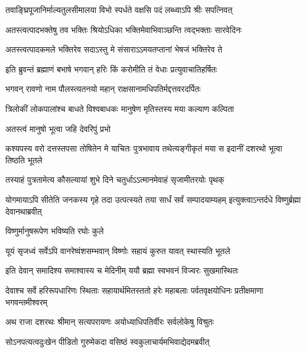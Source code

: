\twolineshloka
{तवाङ्घ्रिपूजानिर्माल्यतुलसीमालया विभो}
{स्पर्धते वक्षसि पदं लब्ध्वाऽपि श्रीः सपत्निवत्} %

\twolineshloka
{अतस्त्वत्पादभक्तेषु तव भक्तिः श्रियोऽधिका}
{भक्तिमेवाभिवाञ्छन्ति त्वद्भक्ताः सारवेदिनः} %

\twolineshloka
{अतस्त्वत्पादकमले भक्तिरेव सदाऽस्तु मे}
{संसाराऽऽमयतप्तानां भेषजं भक्तिरेव ते} %

\twolineshloka
{इति ब्रुवन्तं ब्रह्माणं बभाषे भगवान् हरिः}
{किं करोमीति तं वेधाः प्रत्युवाचातिहर्षितः} %

\twolineshloka
{भगवन् रावणो नाम पौलस्त्यतनयो महान्}
{राक्षसानामधिपतिर्मद्दत्तवरदर्पितः} %

\twolineshloka
{त्रिलोकीं लोकपालांश्च बाधते विश्वबाधकः}
{मानुषेण मृतिस्तस्य मया कल्याण कल्पिता} %

\onelineshloka
{अतस्त्वं मानुषो भूत्वा जहि देवरिपुं प्रभो} %



\threelineshloka
{कश्यपस्य वरो दत्तस्तपसा तोषितेन मे}
{याचितः पुत्रभावाय तथेत्यङ्गीकृतं मया}
{स इदानीं दशरथो भूत्वा तिष्ठति भूतले} %

\twolineshloka
{तस्याहं पुत्रतामेत्य कौसल्यायां शुभे दिने}
{चतुर्धाऽऽत्मानमेवाहं सृजामीतरयोः पृथक्} %

\threelineshloka
{योगमायाऽपि सीतेति जनकस्य गृहे तदा}
{उत्पत्स्यते तया सार्धं सर्वं सम्पादयाम्यहम्}
{इत्युक्त्वाऽन्तर्दधे विष्णुर्ब्रह्मा देवानथाब्रवीत्} %


\onelineshloka
{विष्णुर्मानुषरूपेण भविष्यति रघोः कुले} %

\twolineshloka
{यूयं सृजध्वं सर्वेऽपि वानरेष्वंशसम्भवान्}
{विष्णोः सहायं कुरुत यावत् स्थास्यति भूतले} %

\twolineshloka
{इति देवान् समादिश्य समाश्वास्य च मेदिनीम्}
{ययौ ब्रह्मा स्वभवनं विज्वरः सुखमास्थितः} %

\fourlineindentedshloka
{देवाश्च सर्वे हरिरूपधारिणः}
{स्थिताः सहायार्थमितस्ततो हरेः}
{महाबलाः पर्वतवृक्षयोधिनः}
{प्रतीक्षमाणा भगवन्तमीश्वरम्} %




\twolineshloka
{अथ राजा दशरथः श्रीमान् सत्यपरायणः}
{अयोध्याधिपतिर्वीरः सर्वलोकेषु विश्रुतः} %

\twolineshloka
{सोऽनपत्यत्वदुःखेन पीडितो गुरुमेकदा}
{वसिष्ठं स्वकुलाचार्यमभिवाद्येदमब्रवीत्} %

